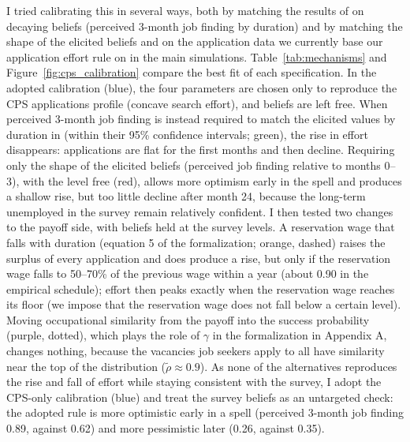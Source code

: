 \documentclass[11pt]{article}
\begin{document}
I tried calibrating this in several ways, both by matching the results of \citet{mueller2021job} on decaying beliefs (perceived 3-month job finding by duration) and by matching the shape of the elicited beliefs
and on the application data we currently base our application effort rule on in the main simulations.
Table~\ref{tab:mechanisms} and Figure~\ref{fig:cps_calibration} compare the best fit of each specification. In the
adopted calibration (blue), the four parameters are chosen only to reproduce the CPS applications profile (concave search effort), and beliefs are
left free. When perceived 3-month job finding is instead required to match the elicited values by duration in
\citet{mueller2021job} (within their 95\% confidence intervals; green), the rise in effort disappears: applications are flat
for the first months and then decline. Requiring only the shape of the elicited beliefs (perceived job finding relative
to months 0--3), with the level free (red), allows more optimism early in the spell and produces a shallow rise, but too
little decline after month 24, because the long-term unemployed in the survey remain relatively confident. I then tested two changes to the
payoff side, with beliefs held at the survey levels. A reservation wage that falls with duration (equation 5 of the
formalization; orange, dashed) raises the surplus of every application and does produce a rise, but only if the reservation wage falls
to 50--70\% of the previous wage within a year (about 0.90 in the empirical schedule); effort then peaks exactly when
the reservation wage reaches its floor (we impose that the reservation wage does not fall below a certain level). Moving occupational similarity from the payoff into the success probability (purple,
dotted), which plays the role of $\gamma$ in the formalization in Appendix A, changes nothing, because the vacancies job seekers apply to all
have similarity near the top of the distribution ($\tilde\rho \approx 0.9$). As none of the alternatives reproduces
the rise and fall of effort while staying consistent with the survey, I adopt the CPS-only calibration (blue) and treat the
survey beliefs as an untargeted check: the adopted rule is more optimistic early in a spell (perceived 3-month job
finding 0.89, against 0.62) and more pessimistic later (0.26, against 0.35).

\end{document}
